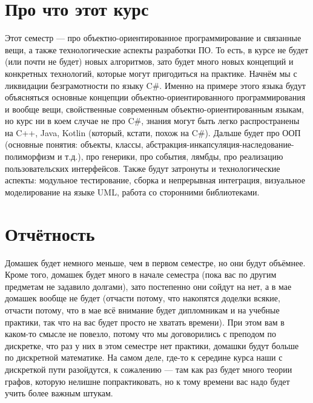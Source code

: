 \documentclass{../../text-style}
\begin{document}
\maketitle
\thispagestyle{empty}

\section{Про что этот курс}

Этот семестр --- про объектно-ориентированное программирование и связанные вещи, а также технологические аспекты разработки ПО. То есть, в курсе не будет (или почти не будет) новых алгоритмов, зато будет много новых концепций и конкретных технологий, которые могут пригодиться на практике. Начнём мы с ликвидации безграмотности по языку C\#. Именно на примере этого языка будут объясняться основные концепции объектно-ориентированного программирования и вообще вещи, свойственные современным объектно-ориентированным языкам, но курс ни в коем случае не про C\#, знания могут быть легко распространены на C++, Java, Kotlin (который, кстати, похож на C\#). Дальше будет про ООП (основные понятия: объекты, классы, абстракция-инкапсуляция-наследование-полиморфизм и т.д.), про генерики, про события, лямбды, про реализацию пользовательских интерфейсов. Также будут затронуты и технологические аспекты: модульное тестирование, сборка и непрерывная интеграция, визуальное моделирование на языке UML, работа со сторонними библиотеками.

\section{Отчётность}

Домашек будет немного меньше, чем в первом семестре, но они будут объёмнее. Кроме того, домашек будет много в начале семестра (пока вас по другим предметам не задавило долгами), зато постепенно они сойдут на нет, а в мае домашек вообще не будет (отчасти потому, что накопятся доделки всякие, отчасти потому, что в мае всё внимание будет дипломникам и на учебные практики, так что на вас будет просто не хватать времени). При этом вам в каком-то смысле не повезло, потому что мы договорились с преподом по дискретке, что раз у них в этом семестре нет практики, домашки будут больше по дискретной математике. На самом деле, где-то к середине курса наши с дискреткой пути разойдутся, к сожалению --- там как раз будет много теории графов, которую нелишне попрактиковать, но к тому времени вас надо будет учить более важным штукам.
\end{document}
